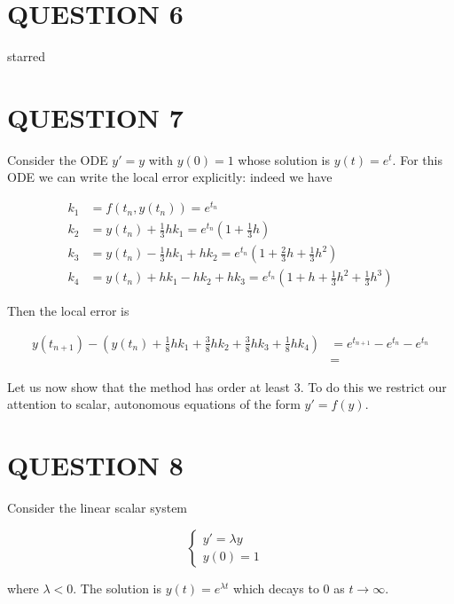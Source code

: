 \documentclass[a4paper]{article}
\begin{document}
\section{QUESTION 6}

starred


\section{QUESTION 7}

Consider the ODE $ y' = y $ with $ y(0) = 1 $ whose solution is $ y(t) = e^{t} $. For this ODE we can write the local error explicitly: indeed we have 

\begin{align*}
k_{1} & = f(t_{n},y(t_{n})) = e^{t_{n}} \\
k_{2} & = y(t_{n}) + \frac{1}{3} h k_{1} = e^{t_{n}} (1 + \frac{1}{3} h) \\
k_{3} & = y(t_{n}) - \frac{1}{3} h k_{1} + h k_{2} = e^{t_{n}}\left(  1 + \frac{2}{3}h + \frac{1}{3} h^{2}  \right)    \\
k_{4} & =  y(t_{n}) + h k_{1} - h k_{2} + h k_{3} = e^{t_{n}}\left(  1 + h + \frac{1}{3} h^{2} + \frac{1}{3} h^{3} \right) 
\end{align*} 

Then the local error is 

\begin{align*}
y(t_{n+1}) -  ( y(t_{n}) + \frac{1}{8} h k_{1} + \frac{3}{8} h k_{2} + \frac{3}{8} h k_{3} + \frac{1}{8} h k_{4}   ) & =  e^{t_{n+1}} - e^{t_{n}} - e^{t_{n}}  \\
& = 
\end{align*}




Let us now show that the method has order at least 3. To do this we restrict our attention to scalar, autonomous equations of the form $ y' = f(y) $. 

\section{QUESTION 8}

Consider the linear scalar system 

\[ \begin{cases} y' = \lambda y  & \\ y(0) = 1&  \end{cases} \]

where $ \lambda < 0 $. The solution is $ y(t) = e^{\lambda t} $ which decays to $ 0 $ as $ t \to \infty $. 
\end{document}
